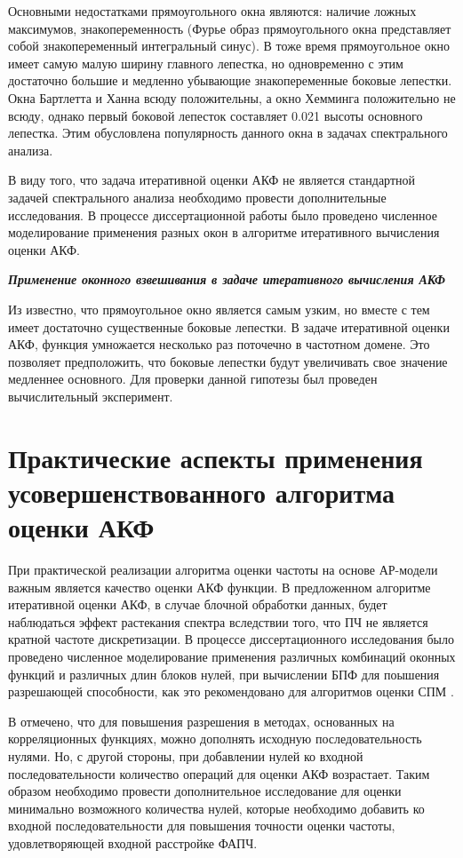 Основными недостатками прямоугольного окна являются: наличие ложных максимумов, знакопеременность (Фурье образ прямоугольного окна представляет собой знакопеременный интегральный синус).
В тоже время прямоугольное окно имеет самую малую ширину главного лепестка, но
одновременно с этим достаточно большие и медленно убывающие знакопеременные боковые лепестки. Окна Бартлетта и Ханна всюду положительны, а окно Хемминга положительно не всюду, однако
первый боковой лепесток составляет 0.021 высоты основного лепестка. Этим обусловлена популярность данного окна в задачах спектрального анализа.

В виду того, что задача итеративной оценки АКФ не является стандартной задачей спектрального анализа необходимо провести дополнительные исследования. В процессе
диссертационной работы было проведено численное моделирование применения разных окон в алгоритме итеративного вычисления оценки АКФ.

{\bf{\textit{Применение оконного взвешивания в задаче итеративного вычисления АКФ}}}

Из \cite{bolshakov-book} известно, что прямоугольное окно является самым узким, но вместе с тем имеет достаточно существенные боковые лепестки. В задаче итеративной оценки
АКФ, функция умножается несколько раз поточечно в частотном домене. Это позволяет предположить, что боковые лепестки будут увеличивать свое значение медленнее основного.
Для проверки данной гипотезы был проведен вычислительный эксперимент.

\section{Практические аспекты применения усовершенствованного алгоритма оценки АКФ}
\label{lab:sec2_windows}

При практической реализации алгоритма оценки частоты на основе АР-модели важным является качество оценки АКФ функции. В предложенном алгоритме итеративной оценки АКФ,
в случае блочной обработки данных, будет наблюдаться эффект растекания спектра вследствии того, что ПЧ не является кратной частоте дискретизации. В процессе диссертационного
исследования было проведено численное моделирование применения различных комбинаций оконных функций и различных длин блоков нулей, при вычислении БПФ для поышения
разрешающей способности, как это рекомендовано для алгоритмов оценки СПМ \cite{bolshakov-book}.

В \cite{bolshakov-book} отмечено, что для повышения разрешения в методах, основанных на корреляционных функциях, можно дополнять исходную последовательность нулями.
Но, с другой стороны, при добавлении нулей ко входной последовательности количество операций для оценки АКФ возрастает. Таким образом необходимо провести дополнительное
исследование для оценки минимально возможного количества нулей, которые необходимо добавить ко входной последовательности для повышения точности оценки частоты,
удовлетворяющей входной расстройке ФАПЧ.

